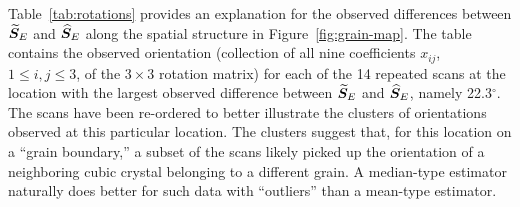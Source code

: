 Table~\ref{tab:rotations} provides an explanation for the observed differences between ${\widetilde{\bm S}_E}$ and ${\widehat{\bm S}_E}$ along the spatial structure in Figure~\ref{fig:grain-map}. The table contains the observed orientation (collection of all nine coefficients $x_{ij}$, $1 \le i,j \le 3$, of the $3\times 3$ rotation matrix) for each of the 14 repeated scans at the location with the largest observed difference between ${\widetilde{\bm S}_E}$ and ${\widehat{\bm S}_E}$, namely 22.3$^\circ$.   The scans have been re-ordered to better illustrate  the clusters of orientations observed at this particular location. The clusters suggest that, for this location on a ``grain boundary,'' a subset of the scans likely picked up the orientation of a neighboring cubic crystal  belonging to a different grain. A median-type estimator naturally does better for such data with ``outliers'' than a mean-type estimator.  
